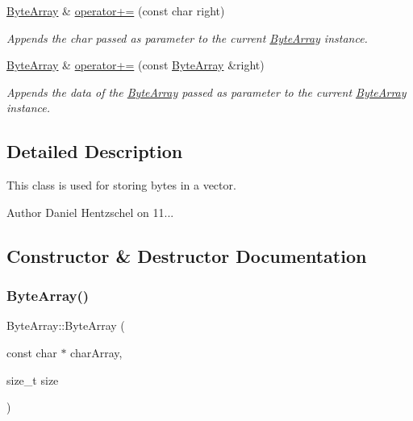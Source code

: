 \begin{DoxyCompactItemize}
\mbox{\hyperlink{class_byte_array}{Byte\+Array}} \& \mbox{\hyperlink{class_byte_array_aa8900e73d7ba3cea9aca18d037a2d017}{operator+=}} (const char right)
\begin{DoxyCompactList}\small\item\em Appends the char passed as parameter to the current \mbox{\hyperlink{class_byte_array}{Byte\+Array}} instance. \end{DoxyCompactList}\item 
\mbox{\hyperlink{class_byte_array}{Byte\+Array}} \& \mbox{\hyperlink{class_byte_array_ab3635362b3abb48c398b38d91e37433b}{operator+=}} (const \mbox{\hyperlink{class_byte_array}{Byte\+Array}} \&right)
\begin{DoxyCompactList}\small\item\em Appends the data of the \mbox{\hyperlink{class_byte_array}{Byte\+Array}} passed as parameter to the current \mbox{\hyperlink{class_byte_array}{Byte\+Array}} instance. \end{DoxyCompactList}\end{DoxyCompactItemize}


\subsection{Detailed Description}
This class is used for storing bytes in a vector. 

\begin{DoxyAuthor}{Author}
Daniel Hentzschel on 11... 
\end{DoxyAuthor}


\subsection{Constructor \& Destructor Documentation}
\mbox{\label{class_byte_array_a5370ae20f7491913d891a624ea77ad52}} 
\subsubsection{\texorpdfstring{ByteArray()}{ByteArray()}\hspace{0.1cm}{\footnotesize\ttfamily [1/3]}}
{\footnotesize\ttfamily Byte\+Array\+::\+Byte\+Array (\begin{DoxyParamCaption}\item[{const char $\ast$}]{char\+Array,  }\item[{size\+\_\+t}]{size }\end{DoxyParamCaption})}



